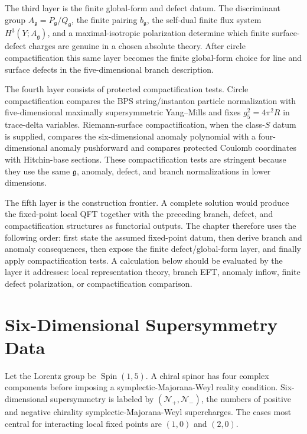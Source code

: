 The third layer is the finite global-form and defect datum.  The
discriminant group \(A_{\mathfrak g}=P_{\mathfrak g}/Q_{\mathfrak g}\), the
finite pairing \(b_{\mathfrak g}\), the self-dual finite flux system
\(H^3(Y;A_{\mathfrak g})\), and a maximal-isotropic polarization determine
which finite surface-defect charges are genuine in a chosen absolute theory.
After circle compactification this same layer becomes the finite global-form
choice for line and surface defects in the five-dimensional branch
description.

The fourth layer consists of protected compactification tests.  Circle
compactification compares the BPS string/instanton particle normalization
with five-dimensional maximally supersymmetric Yang--Mills and fixes
\(g_5^2=4\pi^2R\) in trace-delta variables.  Riemann-surface
compactification, when the class-\(S\) datum is supplied, compares the
six-dimensional anomaly polynomial with a four-dimensional anomaly
pushforward and compares protected Coulomb coordinates with Hitchin-base
sections.  These compactification tests are stringent because they use the
same \(\mathfrak g\), anomaly, defect, and branch normalizations in lower
dimensions.

The fifth layer is the construction frontier.  A complete solution would
produce the fixed-point local QFT together with the preceding branch,
defect, and compactification structures as functorial outputs.  The chapter
therefore uses the following order: first state the assumed fixed-point
datum, then derive branch and anomaly consequences, then expose the finite
defect/global-form layer, and finally apply compactification tests.  A
calculation below should be evaluated by the layer it addresses: local
representation theory, branch EFT, anomaly inflow, finite defect
polarization, or compactification comparison.

\section{Six-Dimensional Supersymmetry Data}

Let the Lorentz group be \(\operatorname{Spin}(1,5)\).  A chiral spinor has
four complex components before imposing a symplectic-Majorana-Weyl reality
condition.  Six-dimensional supersymmetry is labeled by
\((\mathcal N_+,\mathcal N_-)\), the numbers of positive and negative
chirality symplectic-Majorana-Weyl supercharges.  The cases most central for
interacting local fixed points are \((1,0)\) and \((2,0)\).

